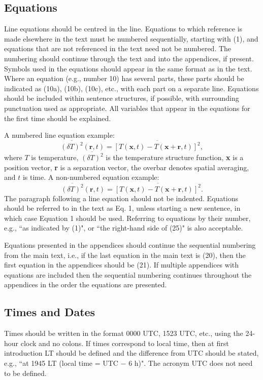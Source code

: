 \subsection{Equations}
Line equations should be centred in the line. Equations to which reference is made elsewhere in the text must be numbered sequentially, starting with (1), and equations that are not referenced in the text need not be numbered. The numbering should continue through the text and into the appendices, if present. Symbols used in the equations should appear in the same format as in the text. Where an equation (e.g., number 10) has several parts, these parts should be indicated as (10a), (10b), (10c), etc., with each part on a separate line. Equations should be included within sentence structures, if possible, with surrounding punctuation used as appropriate. All variables that appear in the equations for the first time should be explained.

A numbered line equation example:
\begin{equation}
\overline{(\delta{T})^2}(\textbf{r},t)=\overline{[T(\textbf{x},t)-T(\textbf{x}+\textbf{r},t)]^2},
\end{equation}
where $T$ is temperature, $\overline{(\delta{T})^2}$ is the temperature structure function, \textbf{x} is a position vector, \textbf{r} is a separation vector, the overbar denotes spatial averaging, and $t$ is time. A non-numbered equation example:
\begin{equation*}
\overline{(\delta{T})^2}(\textbf{r},t)=\overline{[T(\textbf{x},t)-T(\textbf{x}+\textbf{r},t)]^2}.
\end{equation*}
The paragraph following a line equation should not be indented. Equations should be referred to in the text as Eq. 1, unless starting a new sentence, in which case Equation 1 should be used. Referring to equations by their number, e.g., ``as indicated by (1)", or ``the right-hand side of (25)" is also acceptable.

Equations presented in the appendices should continue the sequential numbering from the main text, i.e., if the last equation in the main text is (20), then the first equation in the appendices should be (21). If multiple appendices with equations are included then the sequential numbering continues throughout the appendices in the order the equations are presented.

\subsection{Times and Dates}
Times should be written in the format 0000 UTC, 1523 UTC, etc., using the 24-hour clock and no colons. If times correspond to local time, then at first introduction LT should be defined and the difference from UTC should be stated, e.g., ``at 1945 LT (local time = UTC $-$ 6 h)". The acronym UTC does not need to be defined.

